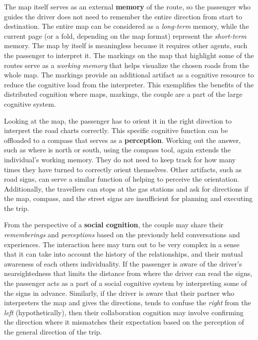 \documentclass[12pt,letterpaper]{article}
\begin{document}
The map itself serves as an external \textbf{memory} of the route, so the passenger who guides the driver does not need to remember the entire direction from start to destination. The entire map can be considered as a \textit{long-term} memory, while the current page (or a fold, depending on the map format) represent the \textit{short-term} memory. The map by itself is meaningless because it requires other agents, such the passenger to interpret it. The markings on the map that highlight some of the routes serve as a \textit{working memory} that helps visualize the chosen roads from the whole map. The markings provide an additional artifact as a cognitive resource to reduce the cognitive load from the interpreter. This exemplifies the benefits of the distributed cognition where maps, markings, the couple are a part of the large cognitive system. 

Looking at the map, the passenger has to orient it in the right direction to interpret the road charts correctly. This specific cognitive function can be offloaded to a compass that serves as a \textbf{perception}. Working out the answer, such as where is north or south, using the compass tool, again extends the individual's working memory. They do not need to keep track for how many times they have turned to correctly orient themselves. Other artifacts, such as road signs, can serve a similar function of helping to perceive the orientation. Additionally, the travellers can stops at the gas stations and ask for directions if the map, compass, and the street signs are insufficient for planning and executing the trip.

From the perspective of a \textbf{social cognition}, the couple may share their \textit{rememberings} and \textit{perceptions} based on the previously held conversations and experiences. The interaction here may turn out to be very complex in a sense that it can take into account the history of the relationships, and their mutual awareness of each others individuality. If the passenger is aware of the driver's nearsightedness that limits the distance from where the driver can read the signs, the passenger acts as a part of a social cognitive system by interpreting some of the signs in advance. Similarly, if the driver is aware that their partner who interpreters the map and gives the directions, tends to confuse the \textit{right} from the \textit{left} (hypothetically), then their collaboration cognition may involve confirming the direction where it mismatches their expectation based on the perception of the general direction of the trip. 
\end{document}
